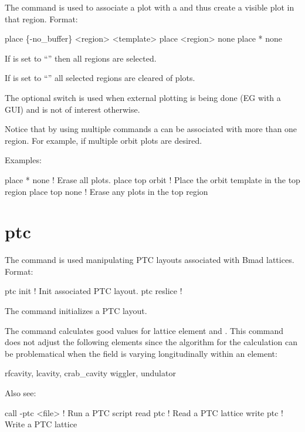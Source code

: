 The  command is used to associate a  plot with a  and thus
create a visible plot in that region. Format:
\begin{example}
  place \{-no_buffer\} <region> <template>
  place <region> none
  place * none
\end{example}

\vskip 10pt 
If  is set to ``\vn{*}'' then all regions are selected.

If  is set to ``'' all selected regions are cleared of plots.

The  optional switch is used when external plotting is being done (EG with a GUI) and
is not of interest otherwise.

Notice that by using multiple  commands a  can be associated with more than
one region. For example, if multiple orbit plots are desired.

Examples:
\begin{example}
  place * none     ! Erase all plots.
  place top orbit  ! Place the orbit template in the top region
  place top none   ! Erase any plots in the top region
\end{example}

\section{ptc}
\label{s:ptc}

The  command is used manipulating PTC layouts associated with Bmad
lattices. Format:
\begin{example}
  ptc init            ! Init associated PTC layout.
  ptc reslice         !
\end{example}

\vskip 10pt 

The  command initializes a PTC layout.

The  command calculates good values for lattice element  and . This
command does not adjust the following elements since the algorithm for the calculation can be problematical when the field
is varying longitudinally within an element:
\begin{example}
  rfcavity, lcavity, crab_cavity
  wiggler, undulator
\end{example}

Also see:
\begin{example}
  call -ptc <file>         ! Run a PTC script
  read ptc                 ! Read a PTC lattice
  write ptc                ! Write a PTC lattice
\end{example}

